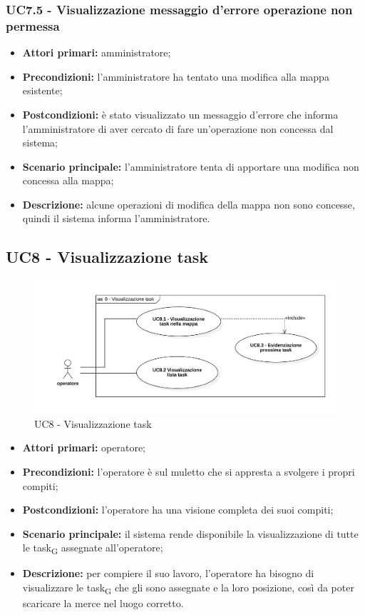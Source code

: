 \subsubsection{UC7.5 - Visualizzazione messaggio d'errore operazione non permessa}
\begin{itemize}
	\item 	\textbf{Attori primari:} amministratore;
	\item 	\textbf{Precondizioni:} l'amministratore ha tentato una modifica alla mappa esistente;
	\item 	\textbf{Postcondizioni:} è stato visualizzato un messaggio d'errore che informa l'amministratore di aver cercato di fare un'operazione non concessa dal sistema;
	\item 	\textbf{Scenario principale:} l'amministratore tenta di apportare una modifica non concessa alla mappa;
	\item 	\textbf{Descrizione:} alcune operazioni di modifica della mappa non sono concesse, quindi il sistema informa l'amministratore.
\end{itemize}

\subsection{UC8 - Visualizzazione task}

\begin{figure}[H]
	\centering
	\includegraphics[scale=0.52]{res/images/uc8.png}
	\caption{UC8 - Visualizzazione task}
\end{figure}


\begin{itemize}
	\item 	\textbf{Attori primari:} operatore;
	\item 	\textbf{Precondizioni:} l'operatore è sul muletto che si appresta a svolgere i propri compiti;
	\item 	\textbf{Postcondizioni:} l'operatore ha una visione completa dei suoi compiti;
	\item 	\textbf{Scenario principale:} il sistema rende disponibile la visualizzazione di tutte le \gls{task}\textsubscript{G} assegnate all'operatore;
	\item 	\textbf{Descrizione:} per compiere il suo lavoro, l'operatore ha bisogno di visualizzare le \gls{task}\textsubscript{G} che gli sono assegnate e la loro posizione, così da poter scaricare la merce nel luogo corretto.

\end{itemize}

